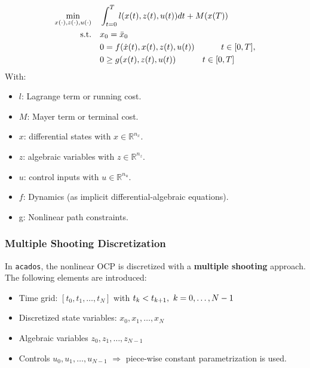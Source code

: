 \documentclass{thesisreport}
\begin{document}
\begin{equation}\label{ocp_continuous_form}
        \begin{aligned}
        \min_{x(\cdot),z(\cdot),u(\cdot)} \quad & \int_{t=0}^{T}{l(x(t), z(t), u(t))dt + M(x(T))}\\
        \textrm{s.t.} \quad & x_0 = \bar{x}_0 \\
            & 0 = f(\dot{x}(t), x(t), z(t), u(t)) \text{\hspace{1cm} }t \in [0,T], \\
            & 0 \geq g(x(t), z(t), u(t)) \text{\hspace{1cm} } t \in [0,T] \\
        \end{aligned}
    \end{equation}
    With: 
    \begin{itemize}
		\item $l$: Lagrange term or running cost.
		\item $M$: Mayer term or terminal cost.        
        \item $x$: differential states with $x \in \mathbb{R}^{n_x}$.
        \item $z$: algebraic variables with $z \in \mathbb{R}^{n_z}$.
        \item $u$: control inputs with $u \in \mathbb{R}^{n_u}$.
        \item $f$: Dynamics (as implicit differential-algebraic equations).
        \item g: Nonlinear path constraints.
    \end{itemize} 
 
\subsubsection{Multiple Shooting Discretization}
In \texttt{acados}, the nonlinear OCP is discretized with a \textbf{multiple shooting} approach. The following elements are introduced:
    \begin{itemize}
        \item Time grid: $[t_0, t_1, \ldots, t_N]$ with $t_k < t_{k+1},\text{\space} k = 0, \ldots, N-1$
        \item Discretized state variables: $x_0, x_1, \ldots, x_N$
        \item Algebraic variables $z_0, z_1, \ldots, z_{N-1}$
        \item Controls $u_0, u_1, \ldots, u_{N-1}$ $\Rightarrow$ piece-wise constant parametrization is used.    
    \end{itemize}    
\end{document}
